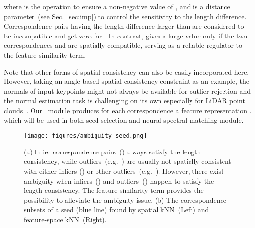 where  is the  operation to ensure {a non-negative value of }, and  is a {distance} parameter~(see Sec.~\ref{sec:imp}) to control the sensitivity to the length difference. Correspondence pairs having the length difference larger than  are considered to be incompatible and get zero for . 
In contrast,  gives a large value only if the two correspondences { and } are spatially compatible, serving as a reliable regulator to the feature similarity term. 

Note that other forms of spatial consistency can also be easily incorporated here. However, taking 
{an angle-based spatial consistency} constraint as an example, the normals of input keypoints might not {always} be available {for} outlier rejection and the normal estimation {task is challenging on its own} especially for LiDAR point clouds~\cite{zhao2019robust}.
Our \nonlocal~module produces {for each correspondence } a feature representation , which will be used in both seed selection and neural spectral matching module.


\begin{figure}[tb]
\setlength{\abovecaptionskip}{0.2cm}
\setlength{\belowcaptionskip}{-0.35cm}
\vspace{-0.5cm}
\texttt{[image: figures/ambiguity\_seed.png]}
    \caption{(a) 
{Inlier correspondence pairs~() always satisfy the length consistency, while outliers~(e.g.~) {are usually not spatially consistent with} either inliers () or {other} outliers~(e.g.~).
However, there exist ambiguity when inliers~() and outliers~() {happen to} satisfy the length consistency.}
The feature similarity term  provides the possibility to alleviate {the ambiguity issue}. (b) The correspondence subsets of {a seed (blue line)}
     found by spatial kNN~(Left) and feature-space
kNN~(Right). } 
    \label{fig:ambiguity}
\end{figure}
















